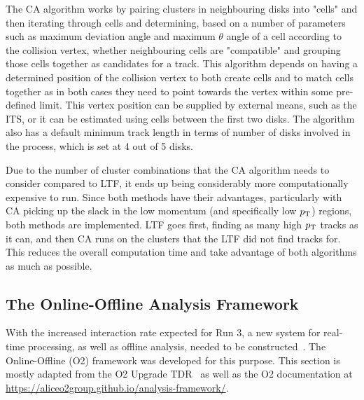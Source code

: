 The CA algorithm works by pairing clusters in neighbouring disks into "cells" and then iterating through cells and determining, based on a number of parameters such as maximum deviation angle and maximum $\theta$ angle of a cell according to the collision vertex, whether neighbouring cells are "compatible" and grouping those cells together as candidates for a track. This algorithm depends on having a determined position of the collision vertex to both create cells and to match cells together as in both cases they need to point towards the vertex within some pre-defined limit. This vertex position can be supplied by external means, such as the ITS, or it can be estimated using cells between the first two disks. The algorithm also has a default minimum track length in terms of number of disks involved in the process, which is set at 4 out of 5 disks. 

Due to the number of cluster combinations that the CA algorithm needs to consider compared to LTF, it ends up being considerably more computationally expensive to run. Since both methods have their advantages, particularly with CA picking up the slack in the low momentum (and specifically low $p_\mathrm{T}$) regions, both methods are implemented. LTF goes first, finding as many high $p_\mathrm{T}$ tracks as it can, and then CA runs on the clusters that the LTF did not find tracks for. This reduces the overall computation time and take advantage of both algorithms as much as possible. 


\subsection{The Online-Offline Analysis Framework}
With the increased interaction rate expected for Run 3, a new system for real-time processing, as well as offline analysis, needed to be constructed~\cite{ALICE_Upgrade_LOI}. The Online-Offline (O2) framework was developed for this purpose. This section is mostly adapted from the O2 Upgrade TDR~\cite{O2_Upgrade_TDR} as well as the O2 documentation at \url{https://aliceo2group.github.io/analysis-framework/}.

